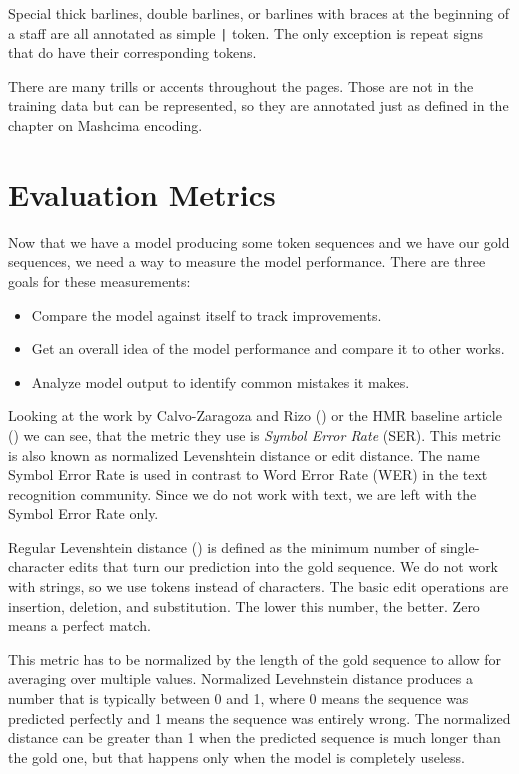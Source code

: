 Special thick barlines, double barlines, or barlines with braces at the beginning of a staff are all annotated as simple \verb`|` token. The only exception is repeat signs that do have their corresponding tokens.

There are many trills or accents throughout the pages. Those are not in the training data but can be represented, so they are annotated just as defined in the chapter on Mashcima encoding.


\section{Evaluation Metrics}

Now that we have a model producing some token sequences and we have our gold sequences, we need a way to measure the model performance. There are three goals for these measurements:

\begin{itemize}
\item Compare the model against itself to track improvements.
\item Get an overall idea of the model performance and compare it to other works.
\item Analyze model output to identify common mistakes it makes.
\end{itemize}

Looking at the work by Calvo-Zaragoza and Rizo (\cite{Primus}) or the HMR baseline article (\cite{HmrBaseline}) we can see, that the metric they use is \emph{Symbol Error Rate} (SER). This metric is also known as normalized Levenshtein distance or edit distance. The name Symbol Error Rate is used in contrast to Word Error Rate (WER) in the text recognition community. Since we do not work with text, we are left with the Symbol Error Rate only.

Regular Levenshtein distance (\cite{Levenshtein}) is defined as the minimum number of single-character edits that turn our prediction into the gold sequence. We do not work with strings, so we use tokens instead of characters. The basic edit operations are insertion, deletion, and substitution. The lower this number, the better. Zero means a perfect match.

This metric has to be normalized by the length of the gold sequence to allow for averaging over multiple values. Normalized Levehnstein distance produces a number that is typically between 0 and 1, where 0 means the sequence was predicted perfectly and 1 means the sequence was entirely wrong. The normalized distance can be greater than 1 when the predicted sequence is much longer than the gold one, but that happens only when the model is completely useless.

